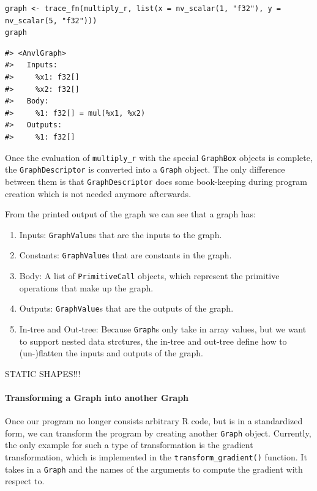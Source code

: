 \begin{verbatim}
graph <- trace_fn(multiply_r, list(x = nv_scalar(1, "f32"), y = nv_scalar(5, "f32")))
graph
\end{verbatim}

\begin{verbatim}
#> <AnvlGraph>
#>   Inputs:
#>     %x1: f32[]
#>     %x2: f32[]
#>   Body:
#>     %1: f32[] = mul(%x1, %x2)
#>   Outputs:
#>     %1: f32[]
\end{verbatim}

Once the evaluation of \texttt{multiply\_r} with the special \texttt{GraphBox} objects is complete, the \texttt{GraphDescriptor} is converted into a \texttt{Graph} object.
The only difference between them is that \texttt{GraphDescriptor} does some book-keeping during program creation which is not needed anymore afterwards.

From the printed output of the graph we can see that a graph has:

\begin{enumerate}
\def\labelenumi{\arabic{enumi}.}
\tightlist
\item
  Inputs: \texttt{GraphValue}s that are the inputs to the graph.
\item
  Constants: \texttt{GraphValue}s that are constants in the graph.
\item
  Body: A list of \texttt{PrimitiveCall} objects, which represent the primitive operations that make up the graph.
\item
  Outputs: \texttt{GraphValue}s that are the outputs of the graph.
\item
  In-tree and Out-tree: Because \texttt{Graph}s only take in array values, but we want to support nested data strctures, the in-tree and out-tree define how to (un-)flatten the inputs and outputs of the graph.
\end{enumerate}

STATIC SHAPES!!!

\paragraph{Transforming a Graph into another Graph}\label{transforming-a-graph-into-another-graph}

Once our program no longer consists arbitrary R code, but is in a standardized form, we can transform the program by creating another \texttt{Graph} object.
Currently, the only example for such a type of transformation is the gradient transformation, which is implemented in the \texttt{transform\_gradient()} function.
It takes in a \texttt{Graph} and the names of the arguments to compute the gradient with respect to.

